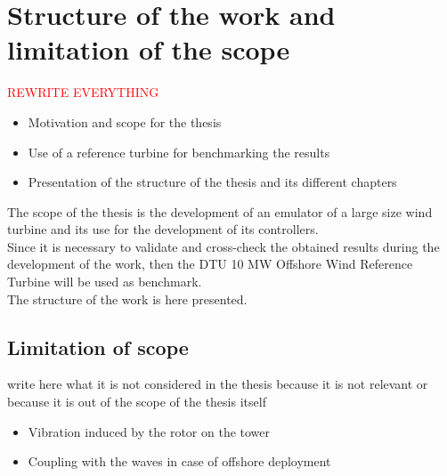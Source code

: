 \newpage
\section{Structure of the work and limitation of the scope}

\textcolor{red}{REWRITE EVERYTHING}
\begin{itemize}
    \item Motivation and scope for the thesis
    \item Use of a reference turbine for benchmarking the results
    \item Presentation of the structure of the thesis and its different chapters
\end{itemize}


The scope of the thesis is the development of an emulator of a large size wind turbine and its use for the development of its controllers.\\

Since it is necessary to validate and cross-check the obtained results during the development of the work, then the DTU 10 MW Offshore Wind Reference Turbine will be used as benchmark.\\

The structure of the work is here presented.\\

\subsection{Limitation of scope}\label{sec:limitation_of_scope}
write here what it is not considered in the thesis because it is not relevant or because it is out of the scope of the thesis itself
\begin{itemize}
    \item Vibration induced by the rotor on the tower
    \item Coupling with the waves in case of offshore deployment
\end{itemize}
